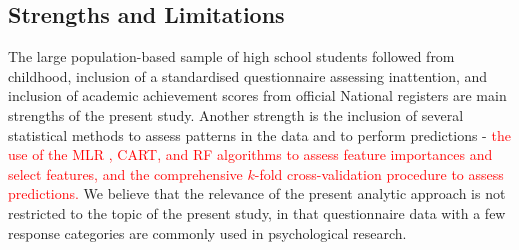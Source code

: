 \documentclass[10pt,letterpaper]{article}
\begin{document}
{{%
% 
%

 \subsection*{Strengths and Limitations}
The large population-based sample of high school students followed from childhood, inclusion of a standardised questionnaire assessing inattention, and inclusion of academic achievement scores from official National registers are main strengths of the present study. Another strength is the inclusion of several statistical methods to 
assess patterns in the data and to perform predictions  - \textcolor{red}{the use of the MLR , CART, and RF algorithms to assess feature importances and select features, 
and the comprehensive $k$-fold cross-validation procedure to assess predictions.} We believe that the relevance of the present analytic approach is not restricted 
to the topic of the present study, in that questionnaire data with a few response categories are commonly used in psychological research. \\

}}
\end{document}
